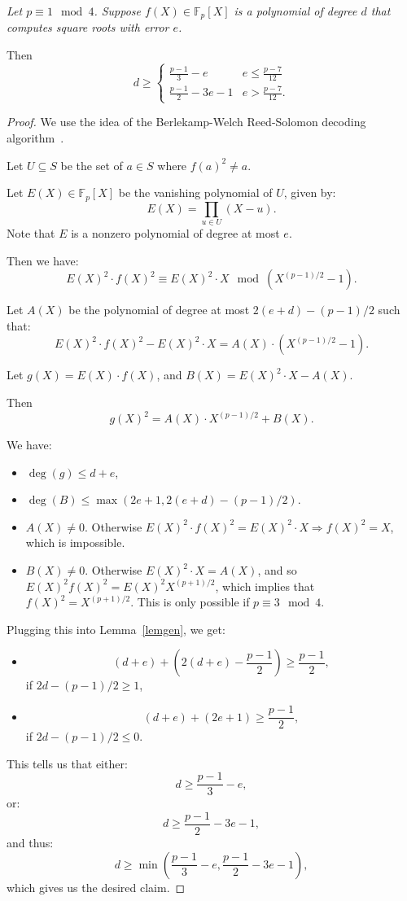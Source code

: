 \documentclass{article}
\newcommand{\F}{\mathbb{F}}
\begin{document}
{\em Let $p \equiv 1 \mod 4$. Suppose $f(X) \in \F_p[X]$ is a polynomial of degree $d$ that computes square roots with error $e$.

Then
$$ d \geq \begin{cases}
    \frac{p-1}{3}  - e &    e \leq \frac{p-7}{12}\\
    \frac{p-1}{2} - 3e - 1 &  e > \frac{p-7}{12}.
          \end{cases}
$$}
\begin{proof}
 We use the idea of the Berlekamp-Welch Reed-Solomon decoding algorithm~\cite{BerlekampWelch}.
 
 Let $U \subseteq S$ be the set of $a \in S$ where $f(a)^2 \neq a$.
 
 Let $E(X) \in \F_p[X]$ be the vanishing polynomial of $U$, given by:
 $$E(X) = \prod_{u \in U} (X - u).$$
 Note that $E$ is a nonzero polynomial of degree at most $e$.
 
 Then we have:
 $$ E(X)^2 \cdot f(X)^2  \equiv  E(X)^2 \cdot X \mod (X^{(p-1)/2} - 1).$$
 
 Let $A(X)$ be the polynomial of degree at most $2(e+d)-(p-1)/2$ such that:
 $$ E(X)^2 \cdot f(X)^2 - E(X)^2 \cdot X = A(X) \cdot (X^{(p-1)/2} - 1).$$ 
 
 Let $g(X) = E(X) \cdot f(X)$, and $B(X) = E(X)^2 \cdot X - A(X)$.
 
 Then
 $$g(X)^2 = A(X) \cdot X^{(p-1)/2}  +  B(X).$$
 
 We have:
 \begin{itemize}
  \item $\deg(g) \leq d+e$,
  \item $\deg(B) \leq \max(2e+1, 2(e+d) - (p-1)/2)$.
  \item $A(X) \neq 0$. Otherwise $E(X)^2 \cdot f(X)^2 = E(X)^2 \cdot X \Longrightarrow f(X)^2 = X$, which is impossible.
  \item $B(X) \neq 0$. Otherwise $E(X)^2 \cdot X = A(X)$, and so 
  $E(X)^2 f(X)^2 =  E(X)^2 X^{(p+1)/2}$, which implies that $f(X)^2 = X^{(p+1)/2}$. This is only possible if $p \equiv 3 \mod 4$.
 \end{itemize}
 Plugging this into Lemma~\ref{lemgen}, we get:
 \begin{itemize}
  \item  $$(d+e) + \left(2(d+e) - \frac{p-1}{2}\right) \geq \frac{p-1}{2},$$
  if $2d - (p-1)/2 \geq 1$,
  \item $$ (d+e) + (2e +1) \geq \frac{p-1}{2},$$
  if $2d - (p-1)/2 \leq 0$.
 \end{itemize}

 This tells us that either:
 $$ d \geq \frac{p-1}{3} - e,$$
 or:
 $$ d \geq \frac{p-1}{2} - 3e - 1,$$
 and thus:
 $$ d \geq \min\left( \frac{p-1}{3} - e, \frac{p-1}{2} - 3e-1 \right),$$
 which gives us the desired claim.
\end{proof}
\end{document}
